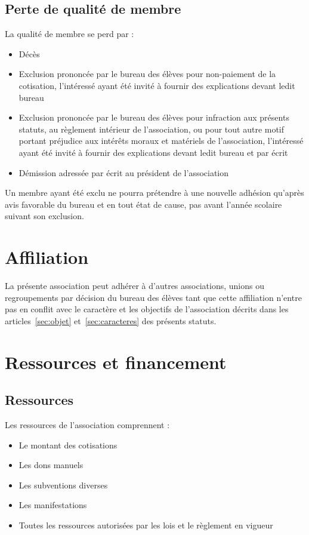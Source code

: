 \documentclass{article}
\begin{document}
		\subsection{Perte de qualité de membre}
		\label{ssec:perte_qualite_membre}
			La qualité de membre se perd par :
			\begin{itemize}
				\item Décès
				\item Exclusion prononcée par le bureau des élèves pour
					non-paiement de la cotisation, l'intéressé ayant été invité
					à fournir des explications devant ledit bureau
				\item Exclusion prononcée par le bureau des élèves pour
					infraction aux présents statuts, au règlement intérieur de
					l'association, ou pour tout autre motif portant préjudice
					aux intérêts moraux et matériels de l’association,
					l'intéressé ayant été invité à fournir des explications
					devant ledit bureau et par écrit
				\item Démission adressée par écrit au président de l’association
			\end{itemize}

			Un membre ayant été exclu ne pourra prétendre à une nouvelle
			adhésion qu’après avis favorable du bureau et en tout état de cause,
			pas avant l’année scolaire suivant son exclusion.

	\section{Affiliation}
		La présente association peut adhérer à d’autres associations, unions ou
		regroupements par décision du bureau des élèves tant que cette
		affiliation n’entre pas en conflit avec le caractère et les objectifs de
		l’association décrits dans les articles~\ref{sec:objet}
		et~\ref{sec:caracteres} des présents statuts.

	\section{Ressources et financement}
		\subsection{Ressources}
			Les ressources de l’association comprennent :
			\begin{itemize}
				\item Le montant des cotisations
				\item Les dons manuels
				\item Les subventions diverses
				\item Les manifestations
				\item Toutes les ressources autorisées par les lois et le
					règlement en vigueur
			\end{itemize}
\end{document}
